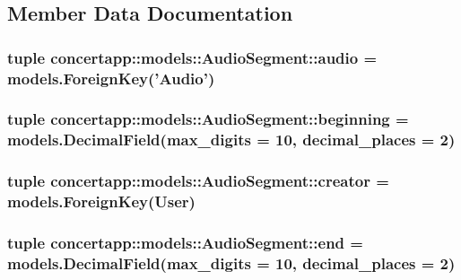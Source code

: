 \subsection{Member Data Documentation}
\hypertarget{classconcertapp_1_1models_1_1_audio_segment_a5f742ddad4cd9d714aac17a770eab421}{
\subsubsection[{audio}]{\setlength{\rightskip}{0pt plus 5cm}tuple {\bf concertapp::models::AudioSegment::audio} = models.ForeignKey('{\bf Audio}')}}
\label{classconcertapp_1_1models_1_1_audio_segment_a5f742ddad4cd9d714aac17a770eab421}
\hypertarget{classconcertapp_1_1models_1_1_audio_segment_ae570405a871fbb22dd5b0ed90b719beb}{
\subsubsection[{beginning}]{\setlength{\rightskip}{0pt plus 5cm}tuple {\bf concertapp::models::AudioSegment::beginning} = models.DecimalField(max\_\-digits = 10, decimal\_\-places = 2)}}
\label{classconcertapp_1_1models_1_1_audio_segment_ae570405a871fbb22dd5b0ed90b719beb}
\hypertarget{classconcertapp_1_1models_1_1_audio_segment_af4c1782a5b5ea04fbb5605b78f81495a}{
\subsubsection[{creator}]{\setlength{\rightskip}{0pt plus 5cm}tuple {\bf concertapp::models::AudioSegment::creator} = models.ForeignKey(User)}}
\label{classconcertapp_1_1models_1_1_audio_segment_af4c1782a5b5ea04fbb5605b78f81495a}
\hypertarget{classconcertapp_1_1models_1_1_audio_segment_ad57bff6ba4812881057215a7b31d452c}{
\subsubsection[{end}]{\setlength{\rightskip}{0pt plus 5cm}tuple {\bf concertapp::models::AudioSegment::end} = models.DecimalField(max\_\-digits = 10, decimal\_\-places = 2)}}
